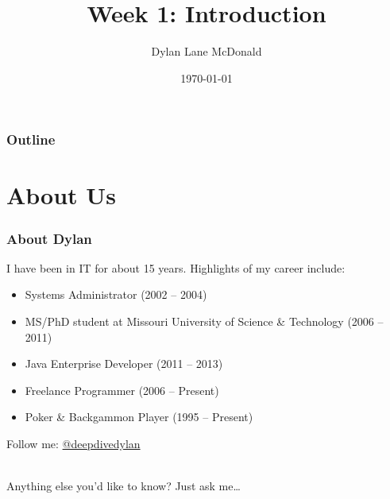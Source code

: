 \documentclass[aspectratio=169]{beamer}
\title{Week 1: Introduction}
\author{Dylan Lane McDonald}
\institute{CNM STEMulus Center\\Web Development with PHP}
\date{\today}
\begin{document}
\begin{frame}
\titlepage
\end{frame}

\begin{frame}
\frametitle{Outline}
\tableofcontents
\end{frame}

\section{About Us}
\begin{frame}
\frametitle{About Dylan}
I have been in IT for about 15 years. Highlights of my  career include:
\begin{itemize}
	\item Systems Administrator (2002 -- 2004)
	\item MS/PhD student at Missouri University of Science \& Technology (2006 -- 2011)
	\item Java Enterprise Developer (2011 -- 2013)
	\item Freelance Programmer (2006 -- Present)
	\item Poker \& Backgammon Player (1995 -- Present)
\end{itemize}
Follow me:  \href{https://twitter.com/deepdivedylan}{@deepdivedylan}

\mbox{}\\
Anything else you'd like to know? Just ask me\dots
\end{frame}
\end{document}
